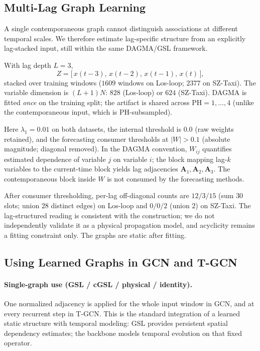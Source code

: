 \subsection{Multi-Lag Graph Learning}\label{sec:gsl_multilag}

A single contemporaneous graph cannot distinguish associations at different
temporal scales. We therefore estimate lag-specific structure from an
explicitly lag-stacked input, still within the same DAGMA/GSL framework.

With lag depth $L=3$,
\[
Z=\bigl[\,x(t-3),\,x(t-2),\,x(t-1),\,x(t)\,\bigr],
\]
stacked over training windows ($1609$ windows on Los-loop; $2377$ on
SZ-Taxi). The variable dimension is $(L+1)N$: $828$ (Los-loop) or $624$
(SZ-Taxi). DAGMA is fitted \emph{once} on the training split; the artifact
is shared across $\mathrm{PH}=1,\ldots,4$ (unlike the contemporaneous input,
which is PH-subsampled).

Here $\lambda_1=0.01$ on both datasets, the internal threshold is $0.0$
(raw weights retained), and the forecasting consumer thresholds at
$|W|>0.1$ (absolute magnitude; diagonal removed). In the DAGMA convention,
$W_{ij}$ quantifies estimated dependence of variable $j$ on variable $i$;
the block mapping lag-$k$ variables to the current-time block yields lag
adjacencies $\mathbf{A}_1,\mathbf{A}_2,\mathbf{A}_3$. The contemporaneous
block inside $W$ is not consumed by the forecasting methods.

After consumer thresholding, per-lag off-diagonal counts are $12/3/15$
(sum $30$ slots; union $28$ distinct edges) on Los-loop and $0/0/2$ (union
$2$) on SZ-Taxi. The lag-structured reading is consistent with the
construction; we do not independently validate it as a physical propagation
model, and acyclicity remains a fitting constraint only. The graphs are
static after fitting.

\subsection{Using Learned Graphs in GCN and T-GCN}\label{sec:consumption}

\paragraph{Single-graph use (GSL / cGSL / physical / identity).}
One normalized adjacency is applied for the whole input window in GCN, and
at every recurrent step in T-GCN. This is the standard integration of a
learned static structure with temporal modeling: GSL provides persistent
spatial dependency estimates; the backbone models temporal evolution on
that fixed operator.

